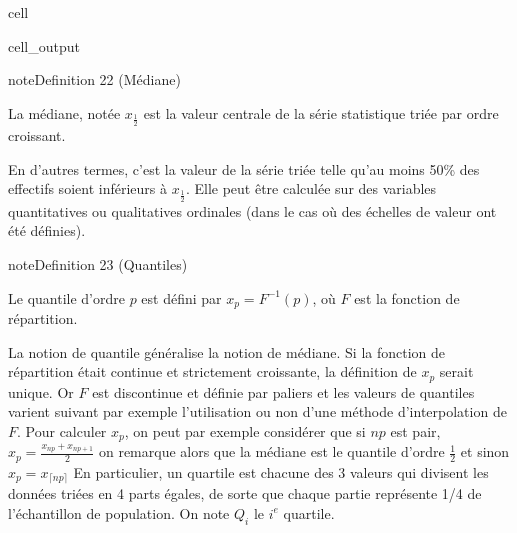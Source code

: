 \documentclass[letterpaper,10pt,french]{sphinxmanual}
\begin{document}
\begin{sphinxuseclass}{cell}
\begin{sphinxuseclass}{cell_output}
\noindent{}

\end{sphinxuseclass}
\end{sphinxuseclass}\label{statsdescriptives:definition-6}
\begin{sphinxadmonition}{note}{Definition 22 (Médiane)}



\sphinxAtStartPar
La médiane, notée \(x_\frac{1}{2}\) est la valeur centrale de la série statistique triée par ordre croissant.
\end{sphinxadmonition}

\sphinxAtStartPar
En d’autres termes, c’est la valeur de la série triée telle qu’au moins 50\% des effectifs soient inférieurs à \(x_\frac{1}{2}\). Elle peut être calculée sur des variables quantitatives ou qualitatives ordinales (dans le cas où des échelles de valeur ont été définies).
\label{statsdescriptives:definition-7}
\begin{sphinxadmonition}{note}{Definition 23 (Quantiles)}



\sphinxAtStartPar
Le quantile d’ordre \(p\) est défini par \(x_p=F^{-1}(p)\), où \(F\) est la fonction de répartition.
\end{sphinxadmonition}

\sphinxAtStartPar
La notion de quantile généralise la notion de médiane. Si la fonction de répartition était continue et strictement croissante, la définition de \(x_p\) serait unique. Or \(F\) est discontinue et définie par paliers et les valeurs de quantiles varient suivant par exemple l’utilisation ou non d’une méthode d’interpolation de \(F\). Pour calculer \(x_p\), on peut par exemple considérer que si \(np\) est pair,
\(x_p=\frac{x_{np}+x_{np+1}}{2}\)
on remarque alors que la médiane est le quantile d’ordre \(\frac{1}{2}\)
et sinon
\(x_p=x_{\lceil{np}\rceil}\)
En particulier, un quartile est chacune des 3 valeurs qui divisent les données triées en 4 parts égales, de sorte que chaque partie représente 1/4 de l’échantillon de population. On note \(Q_i\) le \(i^e\) quartile.
\end{document}

